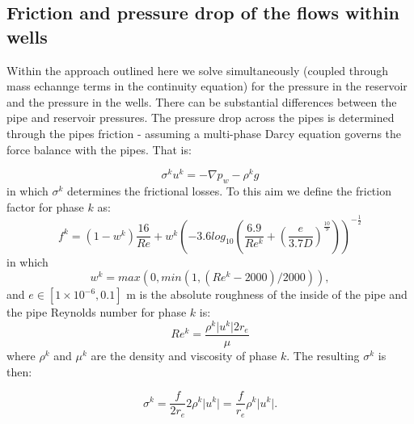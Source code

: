 \subsection{Friction and pressure drop of the flows within wells}
\label{Friction and pressure drop of the flows within wells}

Within the approach outlined here we solve simultaneously (coupled through mass echannge
terms in the continuity equation) for the pressure in the reservoir and the pressure
in the wells. There can be substantial differences between the
pipe and reservoir pressures.
The pressure drop across the pipes is determined through the pipes friction - assuming
a multi-phase Darcy equation governs the force balance with the pipes. That is:

\begin{equation}
\sigma^k u^k = -\nabla p_w - \rho^k g
\end{equation}
in which $\sigma^k $ determines the frictional losses.
To this aim we define the friction factor for phase $k$ as:
\begin{equation}
f^k = (1-w^k) \frac{16}{Re} + w^k \left( -3.6 log_{10}\left(  \frac{6.9}{Re^k} + \left(\frac{e}{3.7D}\right)^{\frac{10}{9}} \right) \right)^{-\frac{1}{2}}
\end{equation}
in which
\begin{equation}
w^k= max(0,  min(1,(Re^k-2000)/2000)  ) ,
\end{equation}
and $e\in\left[1 \times 10^{-6}, 0.1 \right] $ m is the absolute roughness of the inside of the pipe
and the pipe Reynolds number for phase $k$ is:
\begin{equation}
Re^k= \frac{ \rho^k \vert u^k\vert 2 r_e }{\mu}
\end{equation}
where $\rho^k$ and $\mu^k$ are the density and viscosity of phase $k$.
The resulting $\sigma^k$ is then:

\begin{equation}
\sigma^k
    = \frac{f}{2r_e} 2 \rho^k \vert u^k \vert  = \frac{f}{r_e}  \rho^k \vert u^k \vert.
\end{equation}





